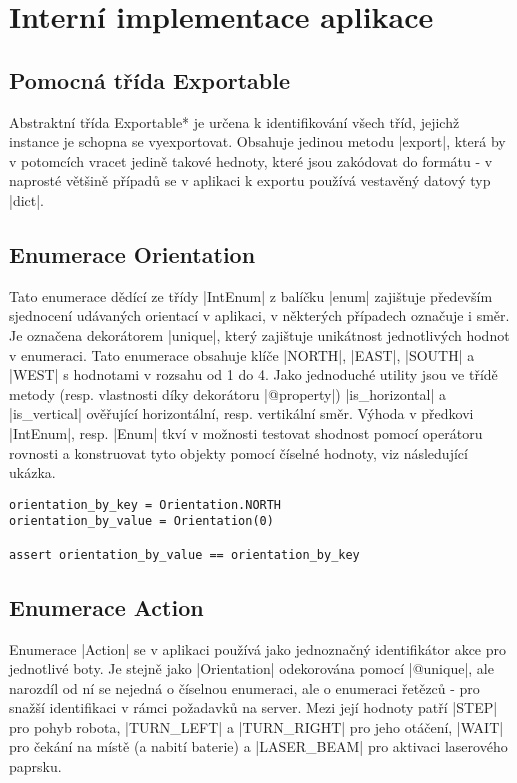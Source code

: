 \section{Interní implementace aplikace}
\label{sec:implementation}

\subsection{Pomocná třída Exportable}

Abstraktní třída \ic*Exportable* je určena k identifikování všech tříd, jejichž instance je schopna se vyexportovat. Obsahuje jedinou metodu \ic|export|, která by v potomcích vracet jedině takové hednoty, které jsou zakódovat do formátu  - v naprosté většině případů se v aplikaci k exportu používá vestavěný datový typ \ic|dict|.

\subsection{Enumerace Orientation}

Tato enumerace dědící ze třídy \ic|IntEnum| z balíčku \ic|enum| zajištuje především sjednocení udávaných orientací v aplikaci, v některých případech označuje i směr. Je označena dekorátorem \ic|unique|, který zajištuje unikátnost jednotlivých hodnot v enumeraci. Tato enumerace obsahuje klíče \ic|NORTH|, \ic|EAST|, \ic|SOUTH| a \ic|WEST| s hodnotami v rozsahu od 1 do 4. Jako jednoduché utility jsou ve třídě metody (resp. vlastnosti díky dekorátoru \ic|@property|) \ic|is_horizontal| a \ic|is_vertical| ověřující horizontální, resp. vertikální směr. Výhoda v předkovi \ic|IntEnum|, resp. \ic|Enum| tkví v možnosti testovat shodnost pomocí operátoru rovnosti a konstruovat tyto objekty pomocí číselné hodnoty, viz následující ukázka.

\begin{lstlisting}[caption={Výhody třídy Enum}]
orientation_by_key = Orientation.NORTH
orientation_by_value = Orientation(0)

assert orientation_by_value == orientation_by_key
\end{lstlisting}

\subsection{Enumerace Action}

Enumerace \ic|Action| se v aplikaci používá jako jednoznačný identifikátor akce pro jednotlivé boty. Je stejně jako \ic|Orientation| odekorována pomocí \ic|@unique|, ale narozdíl od ní se nejedná o číselnou enumeraci, ale o enumeraci řetězců - pro snažší identifikaci v rámci požadavků na server.
Mezi její hodnoty patří \ic|STEP| pro pohyb robota, \ic|TURN_LEFT| a \ic|TURN_RIGHT| pro jeho otáčení, \ic|WAIT| pro čekání na místě (a nabití baterie) a \ic|LASER_BEAM| pro aktivaci laserového paprsku.

